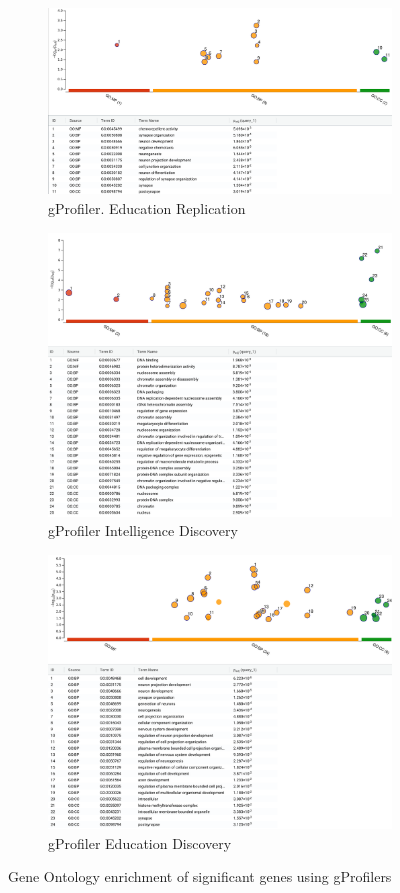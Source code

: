  \begin{figure}
 \centering
  \begin{subfigure}{12cm}
    \centering\includegraphics[width=11cm]{images/gprofiler/gprofiler_ea2_clip.png}
    \caption{gProfiler. Education Replication}
    \end{subfigure}
    
  \begin{subfigure}{12cm}
    \centering\includegraphics[width=11cm]{images/gprofiler/gprofiler_ukbbint_clip.png}
    \caption{gProfiler Intelligence Discovery}
  \end{subfigure}
 
  \begin{subfigure}{12cm}
    \centering\includegraphics[width=11cm]{images/gprofiler/gprofiler_eukbbed_clip.png}
    \caption{gProfiler Education Discovery}
  \end{subfigure}
  \caption{Gene Ontology enrichment of significant genes using gProfilers}
  \label{fig:gProfiler 3 samples}
  

\end{figure}

